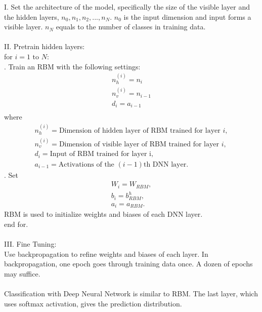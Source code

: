 \documentclass[12pt]{article}
\begin{document}
I. Set the architecture of the model, specifically the size of the visible layer and the hidden layers, \(n_0, n_1, n_2, ..., n_N\). $n_0$ is the input dimension and input forms a visible layer. $n_N$ equals to the number of classes in training data.\\
\\
II. Pretrain hidden layers:\\
for $i = 1\text{ to }N $:\\
. Train an RBM with the following settings:\\
\begin{gather}
n_h^{(i)}=n_i\\
n_v^{(i)}=n_{i-1}\\
d_i=a_{i-1}\\
\end{gather}
\indent where
\begin{gather}
n_h^{(i)} = \text{Dimension of hidden layer of RBM trained for layer }i,\\
n_v^{(i)} = \text{Dimension of visible layer of RBM trained for layer }i,\\
d_i = \text{Input of RBM trained for layer i},\\
a_{i-1} = \text{Activations of the }(i-1)\text{th DNN layer}.
\end{gather}
. Set \begin{gather}
W_i = W_{RBM},\\
b_i = b^h_{RBM},\\
a_i = a_{RBM}.
\end{gather}
\indent RBM is used to initialize weights and biases of each DNN layer.\\
end for.\\
\\
III. Fine Tuning:\\
Use backpropagation to refine weights and biases of each layer. In backpropagation, one epoch goes through training data once. A dozen of epochs may suffice.\\
\\
Classification with Deep Neural Network is similar to RBM. The last layer, which uses softmax activation, gives the prediction distribution.
\end{document}
